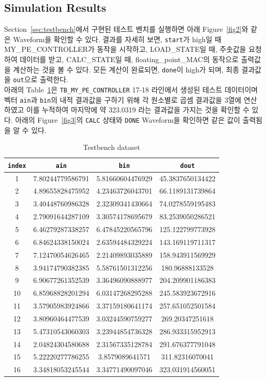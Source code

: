 \documentclass{article}
\begin{document}
\subsection{Simulation Results}
Section~\ref{sec:testbench}에서 구현된 테스트 벤치를 실행하면 아래 Figure~\ref{fig2}와 같은 Waveform을 확인할 수 있다. 결과를 자세히 보면, \texttt{start}가 high일 때 MY\_PE\_CONTROLLER가 동작을 시작하고, LOAD\_STATE일 때, 주솟값을 요청하여 데이터를 받고, CALC\_STATE일 때, floating\_point\_MAC의 동작으로 출력값을 계산하는 것을 볼 수 있다. 모든 계산이 완료되면, \texttt{done}이 high가 되며, 최종 결과값을 \texttt{out}으로 출력한다.\\

아래의 Table~\ref{tab1}은 \texttt{TB\_MY\_PE\_CONTROLLER} 17-18 라인에서 생성된 테스트 데이터이며 벡터 \texttt{ain}과 \texttt{bin}의 내적 결과값을 구하기 위해 각 원소별로 곱셈 결과값을 3열에 연산하였고 이를 누적하여 마지막에 약 323.0319 라는 결과값을 가지는 것을 확인할 수 있다. 아래의 Figure~\ref{fig3}의 \texttt{CALC} 상태와 \texttt{DONE} Waveform을 확인하면 같은 값이 출력됨을 알 수 있다.

\begin{table}[htb]
\renewcommand*{\arraystretch}{1.4}
\begin{center}
\begin{tabular}{ |c|c|c|c| } 
 \hline
 \textbf{\texttt{index}} & \textbf{\texttt{ain}} & \textbf{\texttt{bin}} & \textbf{\texttt{dout}} \\ 
 \hline
1 & 7.80244779586791 & 5.81660604476929 & 45.3837650134422 \\
2 & 4.89655828475952 & 4.23463726043701 & 66.1189131739864 \\
3 & 3.40448760986328 & 2.32309341430664 & 74.0278559195483 \\
4 & 2.79091644287109 & 3.30574178695679 & 83.2539050286521 \\
5 & 6.46279287338257 & 6.47845220565796 & 125.122799773928 \\
6 & 6.84624338150024 & 2.63594484329224 & 143.169119711317 \\
7 & 7.12470054626465 & 2.21409893035889 & 158.943911569929 \\
8 & 3.94174790382385 & 5.58761501312256 & 180.96888133528 \\
9 & 6.90677261352539 & 3.36496090888977 & 204.209901186383 \\
10 & 6.85968828201294 & 6.03147268295288 & 245.583923672916 \\
11 & 3.57905983924866 & 3.37159180641174 & 257.651052501584 \\
12 & 3.80960464477539 & 3.03244590759277 & 269.20347251618 \\
13 & 5.47310543060303 & 3.23944854736328 & 286.933315952913 \\
14 & 2.04824304580688 & 2.31567335128784 & 291.676377791048 \\
15 & 5.22220277786255 & 3.8579089641571 & 311.82316070041 \\
16 & 3.34818053245544 & 3.34771490097046 & 323.031914560051 \\
\hline
\end{tabular}
\caption{Testbench dataset}
\label{tab1}
\end{center}
\end{table}
\end{document}
